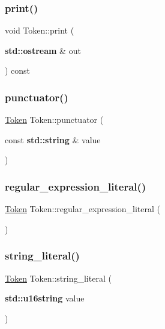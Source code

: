 \subsubsection{\texorpdfstring{print()}{print()}}
{\footnotesize\ttfamily void Token\+::print (\begin{DoxyParamCaption}\item[{\textbf{ std\+::ostream} \&}]{out }\end{DoxyParamCaption}) const}

\mbox{\label{class_token_aef1c084308395ed9ad7328a6aa321e5a}} 
\subsubsection{\texorpdfstring{punctuator()}{punctuator()}}
{\footnotesize\ttfamily \hyperlink{class_token}{Token} Token\+::punctuator (\begin{DoxyParamCaption}\item[{const \textbf{ std\+::string} \&}]{value }\end{DoxyParamCaption})\hspace{0.3cm}{\ttfamily [static]}}

\mbox{\label{class_token_a70cc5b1f483d5f8f58290e70867d542e}} 
\subsubsection{\texorpdfstring{regular\+\_\+expression\+\_\+literal()}{regular\_expression\_literal()}}
{\footnotesize\ttfamily \hyperlink{class_token}{Token} Token\+::regular\+\_\+expression\+\_\+literal (\begin{DoxyParamCaption}{ }\end{DoxyParamCaption})\hspace{0.3cm}{\ttfamily [static]}}

\mbox{\label{class_token_a51926fd7d348479bf923c6fce7650f35}} 
\subsubsection{\texorpdfstring{string\+\_\+literal()}{string\_literal()}}
{\footnotesize\ttfamily \hyperlink{class_token}{Token} Token\+::string\+\_\+literal (\begin{DoxyParamCaption}\item[{\textbf{ std\+::u16string}}]{value }\end{DoxyParamCaption})\hspace{0.3cm}{\ttfamily [static]}}

